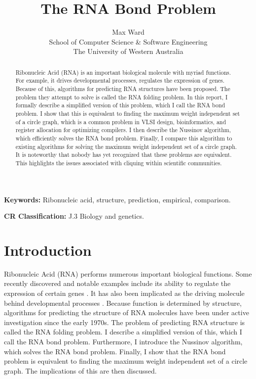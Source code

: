 \documentclass[12pt, a4paper]{article}
\title{The RNA Bond Problem}
\author{Max Ward \\
School of Computer Science \& Software Engineering \\
The University of Western Australia}
\begin{document}
\maketitle

\begin{abstract}
Ribonucleic Acid (RNA) is an important biological molecule with myriad functions. For example, it drives developmental processes, regulates the expression of genes. Because of this, algorithms for predicting RNA structures have been proposed. The problem they attempt to solve is called the RNA folding problem. In this report, I formally describe a simplified version of this problem, which I call the RNA bond problem. I show that this is equivalent to finding the maximum weight independent set of a circle graph, which is a common problem in VLSI design, bioinformatics, and register allocation for optimizing compilers. I then describe the Nussinov algorithm, which efficiently solves the RNA bond problem. Finally, I compare this algorithm to existing algorithms for solving the maximum weight independent set of a circle graph. It is noteworthy that nobody has yet recognized that these problems are equivalent. This highlights the issues associated with cliquing within scientific communities.
\end{abstract}


{\bf Keywords:} Ribonucleic acid, structure, prediction, empirical, comparison.

{\bf CR Classification:} J.3 Biology and genetics.

\clearpage


\section{Introduction}
Ribonucleic Acid (RNA) performs numerous important biological functions. Some recently discovered and notable examples include its ability to regulate the expression of certain genes \cite{mattick2007new}. It has also been implicated as the driving molecule behind developmental processes \cite{mattick2007new}. Because function is determined by structure, algorithms for predicting the structure of RNA molecules have been under active investigation since the early 1970s. The problem of predicting RNA structure is called the RNA folding problem. I describe a simplified version of this, which I call the RNA bond problem. Furthermore, I introduce the Nussinov algorithm, which solves the RNA bond problem. Finally, I show that the RNA bond problem is equivalent to finding the maximum weight independent set of a circle graph. The implications of this are then discussed.
\end{document}
